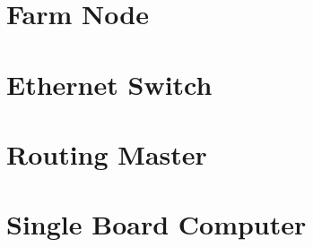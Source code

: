 \section{Farm Node}
\label{l3-farm}

\section{Ethernet Switch}
\label{l3-eth}

\section{Routing Master}
\label{l3-rm}

\section{Single Board Computer}
\label{l3-sbc}


